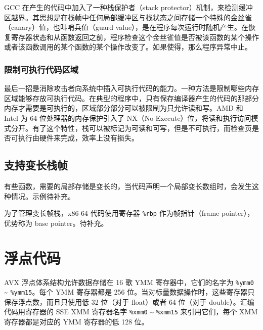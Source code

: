 GCC 在产生的代码中加入了一种栈保护者（stack protector）机制，来检测缓冲区越界。其思想是在栈帧中任何局部缓冲区与栈状态之间存储一个特殊的金丝雀（canary）值，也叫哨兵值（guard value），是在程序每次运行时随机产生。在恢复寄存器状态和从函数返回之前，程序检查这个金丝雀值是否被该函数的某个操作或者该函数调用的某个函数的某个操作改变了。如果使得，那么程序异常中止。

\subsubsection{限制可执行代码区域}

最后一招是消除攻击者向系统中插入可执行代码的能力。一种方法是限制哪些内存区域能够存放可执行代码。在典型的程序中，只有保存编译器产生的代码的那部分内存才需要是可执行的，区域部分部分可以被限制为只允许读和写。AMD 和 Intel 为 64 位处理器的内存保护引入了 NX（No-Execute）位，将读和执行访问模式分开。有了这个特性，栈可以被标记为可读和可写，但是不可执行，而检查页是否可执行由硬件来完成，效率上没有损失。

\subsection{支持变长栈帧}

有些函数，需要的局部存储是变长的，当代码声明一个局部变长数组时，会发生这种情况。示例待补充。

为了管理变长帧栈，x86-64 代码使用寄存器 \verb|%rbp| 作为帧指针（frame pointer），优势称为 base pointer。待补充。

\section{浮点代码}

AVX 浮点体系结构允许数据存储在 16 歌 YMM 寄存器中，它们的名字为 \verb|%ymm0| \~{} \verb|%ymm15|。每个 YMM 寄存器都是 256 位。当对标量数据操作时，这些寄存器只保存浮点数，而且只使用低 32 位（对于 float）或者 64 位（对于 double）。汇编代码用寄存器的 SSE XMM 寄存器名字 \verb|%xmm0| \~{} \verb|%xmm15| 来引用它们，每个 XMM 寄存器都是对应的 YMM 寄存器的低 128 位。

